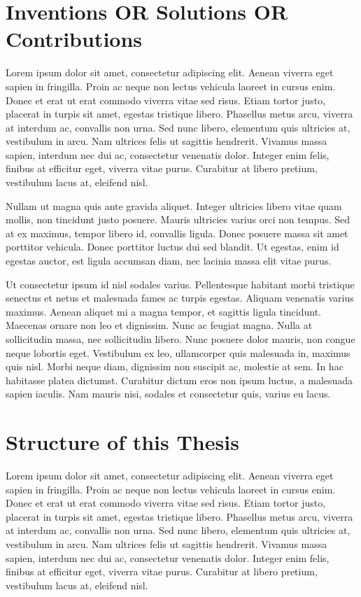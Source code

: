 \section{Inventions OR Solutions OR Contributions}

Lorem ipsum dolor sit amet, consectetur adipiscing elit. Aenean viverra eget sapien in fringilla. Proin ac neque non lectus vehicula laoreet in cursus enim. Donec et erat ut erat commodo viverra vitae sed risus. Etiam tortor justo, placerat in turpis sit amet, egestas tristique libero. Phasellus metus arcu, viverra at interdum ac, convallis non urna. Sed nunc libero, elementum quis ultricies at, vestibulum in arcu. Nam ultrices felis ut sagittis hendrerit. Vivamus massa sapien, interdum nec dui ac, consectetur venenatis dolor. Integer enim felis, finibus at efficitur eget, viverra vitae purus. Curabitur at libero pretium, vestibulum lacus at, eleifend nisl.

Nullam ut magna quis ante gravida aliquet. Integer ultricies libero vitae quam mollis, non tincidunt justo posuere. Mauris ultricies varius orci non tempus. Sed at ex maximus, tempor libero id, convallis ligula. Donec posuere massa sit amet porttitor vehicula. Donec porttitor luctus dui sed blandit. Ut egestas, enim id egestas auctor, est ligula accumsan diam, nec lacinia massa elit vitae purus.

Ut consectetur ipsum id nisl sodales varius. Pellentesque habitant morbi tristique senectus et netus et malesuada fames ac turpis egestas. Aliquam venenatis varius maximus. Aenean aliquet mi a magna tempor, et sagittis ligula tincidunt. Maecenas ornare non leo et dignissim. Nunc ac feugiat magna. Nulla at sollicitudin massa, nec sollicitudin libero. Nunc posuere dolor mauris, non congue neque lobortis eget. Vestibulum ex leo, ullamcorper quis malesuada in, maximus quis nisl. Morbi neque diam, dignissim non suscipit ac, molestie at sem. In hac habitasse platea dictumst. Curabitur dictum eros non ipsum luctus, a malesuada sapien iaculis. Nam mauris nisi, sodales et consectetur quis, varius eu lacus.


\section{Structure of this Thesis}

Lorem ipsum dolor sit amet, consectetur adipiscing elit. Aenean viverra eget sapien in fringilla. Proin ac neque non lectus vehicula laoreet in cursus enim. Donec et erat ut erat commodo viverra vitae sed risus. Etiam tortor justo, placerat in turpis sit amet, egestas tristique libero. Phasellus metus arcu, viverra at interdum ac, convallis non urna. Sed nunc libero, elementum quis ultricies at, vestibulum in arcu. Nam ultrices felis ut sagittis hendrerit. Vivamus massa sapien, interdum nec dui ac, consectetur venenatis dolor. Integer enim felis, finibus at efficitur eget, viverra vitae purus. Curabitur at libero pretium, vestibulum lacus at, eleifend nisl.

